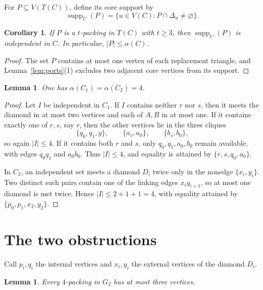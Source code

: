 \documentclass[11pt]{amsart}
\newtheorem{lemma}[theorem]{Lemma}
\newtheorem{corollary}[theorem]{Corollary}
\newcommand{\supp}{\operatorname{supp}}
\begin{document}
For $P\subseteq V(T(C))$, define its core support by
\[
 \supp_C(P)=\{u\in V(C):P\cap\Delta_u\ne\varnothing\}.
\]

\begin{corollary}\label{cor:support}
If $P$ is a $t$-packing in $T(C)$ with $t\ge3$, then $\supp_C(P)$ is
independent in $C$. In particular, $|P|\le\alpha(C)$.
\end{corollary}

\begin{proof}
The set $P$ contains at most one vertex of each replacement triangle, and
Lemma~\ref{lem:ports}(1) excludes two adjacent core vertices from its
support.
\end{proof}

\begin{lemma}\label{lem:alpha}
One has $\alpha(C_1)=\alpha(C_2)=4$.
\end{lemma}

\begin{proof}
Let $I$ be independent in $C_1$. If $I$ contains neither $r$ nor $s$,
then it meets the diamond in at most two vertices and each of $A,B$ in at
most one. If it contains exactly one of $r,s$, say $r$, then the other
vertices lie in the three cliques
\[
 \{q_0,q_1,y\},\qquad \{a_s,a_0\},\qquad \{b_s,b_0\},
\]
so again $|I|\le4$. If it contains both $r$ and $s$, only
$q_0,q_1,a_0,b_0$ remain available, with edges $q_0q_1$ and $a_0b_0$.
Thus $|I|\le4$, and equality is attained by $\{r,s,q_0,a_0\}$.

In $C_2$, an independent set meets a diamond $D_i$ twice only in the
nonedge $\{x_i,y_i\}$. Two distinct such pairs contain one of the linking
edges $x_i y_{i+1}$, so at most one diamond is met twice. Hence
$|I|\le2+1+1=4$, with equality attained by
$\{p_0,p_1,x_2,y_2\}$.
\end{proof}

\section{The two obstructions}

Call $p_i,q_i$ the internal vertices and $x_i,y_i$ the external vertices
of the diamond $D_i$.

\begin{lemma}\label{lem:G2}
Every $4$-packing in $G_2$ has at most three vertices.
\end{lemma}
\end{document}
